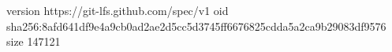 version https://git-lfs.github.com/spec/v1
oid sha256:8afd641df9e4a9cb0ad2ae2d5cc5d3745ff6676825cdda5a2ca9b29083df9576
size 147121
